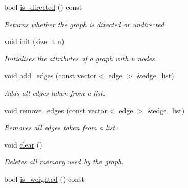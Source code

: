 \begin{DoxyCompactItemize}
bool \hyperlink{classlgraph_1_1utils_1_1udgraph_aa6fc318096cc4b577374f002b07ab49b}{is\+\_\+directed} () const 
\begin{DoxyCompactList}\small\item\em Returns whether the graph is directed or undirected. \end{DoxyCompactList}\item 
void \hyperlink{classlgraph_1_1utils_1_1uxgraph_ab1e7ab39be6e8ca6149eef47dd51b155}{init} (size\+\_\+t n)
\begin{DoxyCompactList}\small\item\em Initialises the attributes of a graph with {\itshape n} nodes. \end{DoxyCompactList}\item 
void \hyperlink{classlgraph_1_1utils_1_1uxgraph_af6f7c0a2dc67706a07bd58f06b3dcf9f}{add\+\_\+edges} (const vector$<$ \hyperlink{namespacelgraph_1_1utils_a6510284ce1b1ae5dc97ce5d2de426e10}{edge} $>$ \&edge\+\_\+list)
\begin{DoxyCompactList}\small\item\em Adds all edges taken from a list. \end{DoxyCompactList}\item 
void \hyperlink{classlgraph_1_1utils_1_1uxgraph_a83e447e3c405700f36a1cce1c227f3f1}{remove\+\_\+edges} (const vector$<$ \hyperlink{namespacelgraph_1_1utils_a6510284ce1b1ae5dc97ce5d2de426e10}{edge} $>$ \&edge\+\_\+list)
\begin{DoxyCompactList}\small\item\em Removes all edges taken from a list. \end{DoxyCompactList}\item 
void \hyperlink{classlgraph_1_1utils_1_1uxgraph_ae76c83683dc7527fe5394d67437a7107}{clear} ()
\begin{DoxyCompactList}\small\item\em Deletes all memory used by the graph. \end{DoxyCompactList}\item 
bool \hyperlink{classlgraph_1_1utils_1_1uxgraph_ae1c3f40bb80ab20c2de96735ccde7b3f}{is\+\_\+weighted} () const \hypertarget{classlgraph_1_1utils_1_1uxgraph_ae1c3f40bb80ab20c2de96735ccde7b3f}{}\label{classlgraph_1_1utils_1_1uxgraph_ae1c3f40bb80ab20c2de96735ccde7b3f}


\end{DoxyCompactItemize}
